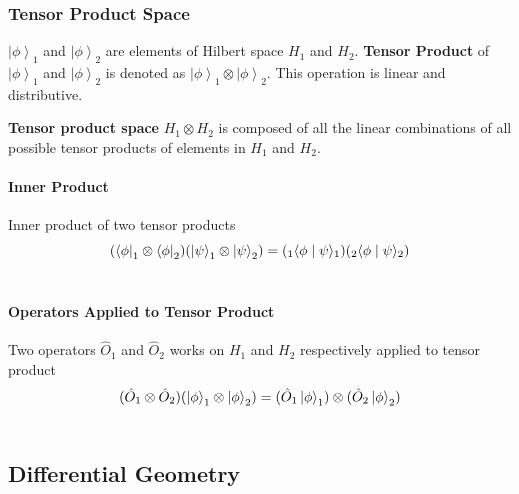 \documentclass[letterpaper,10pt,english]{sphinxmanual}
\newcommand{\bra}[1]{\left\langle #1\right|}
\newcommand{\ket}[1]{\left| #1\right\rangle}
\newcommand{\braket}[2]{\langle #1 \mid #2 \rangle}
\begin{document}
\subsubsection{Tensor Product Space}
\label{math:tensorproductspace}\label{math:tensor-product-space}
$\ket{\phi}_1$ and $\ket{\phi}_2$ are elements of Hilbert space $H_1$ and $H_2$. \textbf{Tensor Product} of $\ket{\phi}_1$ and $\ket{\phi}_2$ is denoted as $\ket{\phi}_1\otimes \ket{\phi}_2$. This operation is linear and distributive.

\textbf{Tensor product space} $H_1\otimes H_2$ is composed of all the linear combinations of all possible tensor products of elements in $H_1$ and $H_2$.


\paragraph{Inner Product}
\label{math:inner-product}
Inner product of two tensor products
\begin{gather}
\begin{split}(\bra{\phi}_1\otimes \bra{\phi}_2)(\ket{\psi}_1\otimes \ket{\psi}_2) = ( {} _ 1 \braket{\phi}{\psi}_1)({}_2\braket{\phi}{\psi}_2)\end{split}\notag\\\begin{split}\end{split}\notag
\end{gather}

\paragraph{Operators Applied to Tensor Product}
\label{math:operators-applied-to-tensor-product}
Two operators $\hat O_1$ and $\hat O_2$ works on $H_1$ and $H_2$ respectively applied to tensor product
\begin{gather}
\begin{split}(\hat O_1 \otimes \hat O_2 )( \ket{\phi}_1\otimes \ket{\phi}_2 ) = (\hat O_1 \ket{\phi}_1) \otimes (\hat O_2 \ket{\phi}_2)\end{split}\notag\\\begin{split}\end{split}\notag
\end{gather}

\subsection{Differential Geometry}
\label{math:differential-geometry}
\end{document}
